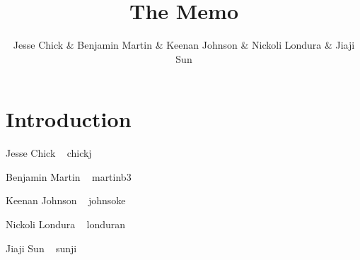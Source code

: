 \documentclass[12pt]{article}
\title{The Memo}
\author{Jesse Chick \& Benjamin Martin \& Keenan Johnson \& Nickoli Londura \& Jiaji Sun}
\begin{document}
\maketitle
\tableofcontents

\section{Introduction}
\par Jesse Chick ~ chickj
\par Benjamin Martin ~ martinb3
\par Keenan Johnson ~ johnsoke
\par Nickoli Londura ~ londuran
\par Jiaji Sun ~ sunji
\end{document}
